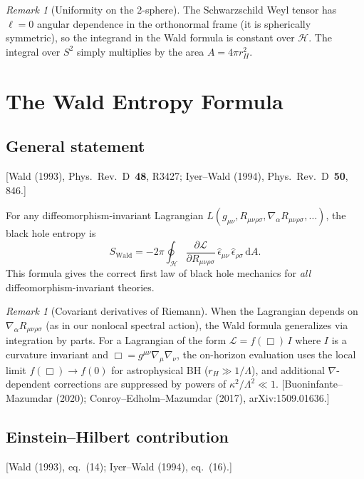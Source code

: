 \documentclass[12pt,a4paper]{article}
\theoremstyle{definition}
\theoremstyle{remark}
\newtheorem{remark}[proposition]{Remark}
\newcommand{\dd}{\mathrm{d}}
\newcommand{\fromlit}[1]{\textcolor{blue!70!black}{\textsf{[#1]}}}
\begin{document}
\begin{remark}[Uniformity on the 2-sphere]
The Schwarzschild Weyl tensor has $\ell = 0$ angular dependence in the
orthonormal frame (it is spherically symmetric), so the integrand in the
Wald formula is constant over $\mathcal{H}$.  The integral over $S^2$
simply multiplies by the area $A = 4\pi r_H^2$.
\end{remark}


\section{The Wald Entropy Formula}
\label{sec:wald}

\subsection{General statement}
\fromlit{Wald (1993), Phys.\ Rev.\ D~\textbf{48}, R3427;
Iyer--Wald (1994), Phys.\ Rev.\ D~\textbf{50}, 846.}

For any diffeomorphism-invariant Lagrangian $L(g_{\mu\nu},
R_{\mu\nu\rho\sigma}, \nabla_\alpha R_{\mu\nu\rho\sigma}, \ldots)$,
the black hole entropy is
\begin{equation}\label{eq:wald-general}
  \boxed{
  S_{\mathrm{Wald}} = -2\pi \oint_{\mathcal{H}}
  \frac{\partial\mathcal{L}}{\partial R_{\mu\nu\rho\sigma}}\,
  \hat{\epsilon}_{\mu\nu}\,\hat{\epsilon}_{\rho\sigma}\,\dd A.}
\end{equation}
This formula gives the correct first law of black hole mechanics for
\emph{all} diffeomorphism-invariant theories.

\begin{remark}[Covariant derivatives of Riemann]
When the Lagrangian depends on $\nabla_\alpha R_{\mu\nu\rho\sigma}$
(as in our nonlocal spectral action), the Wald formula generalizes
via integration by parts.  For a Lagrangian of the form
$\mathcal{L} = f(\Box)\,I$ where $I$ is a curvature invariant and
$\Box = g^{\mu\nu}\nabla_\mu\nabla_\nu$, the on-horizon evaluation
uses the local limit $f(\Box) \to f(0)$ for astrophysical BH
($r_H \gg 1/\Lambda$), and additional $\nabla$-dependent corrections
are suppressed by powers of $\kappa^2/\Lambda^2 \ll 1$.
\fromlit{Buoninfante--Mazumdar (2020); Conroy--Edholm--Mazumdar (2017),
arXiv:1509.01636.}
\end{remark}

\subsection{Einstein--Hilbert contribution}
\fromlit{Wald (1993), eq.~(14); Iyer--Wald (1994), eq.~(16).}
\end{document}
